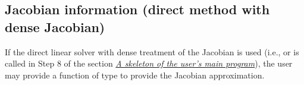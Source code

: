 \documentclass[letterpaper,10pt,english]{sphinxmanual}
\begin{document}
\subsection{Jacobian information (direct method with dense Jacobian)}
\label{c_interface/User_supplied:cinterface-densejacobianfn}\label{c_interface/User_supplied:jacobian-information-direct-method-with-dense-jacobian}
If the direct linear solver with dense treatment of the Jacobian is
used (i.e., {\hyperref[c_interface/User_callable:ARKDense]{}} or {\hyperref[c_interface/User_callable:ARKLapackDense]{}} is
called in Step 8 of the section {\hyperref[c_interface/Skeleton:cinterface-skeleton]{\emph{A skeleton of the user's main program}}}), the user
may provide a function of type {\hyperref[c_interface/User_supplied:ARKDlsDenseJacFn]{}} to provide
the Jacobian approximation.
\end{document}
